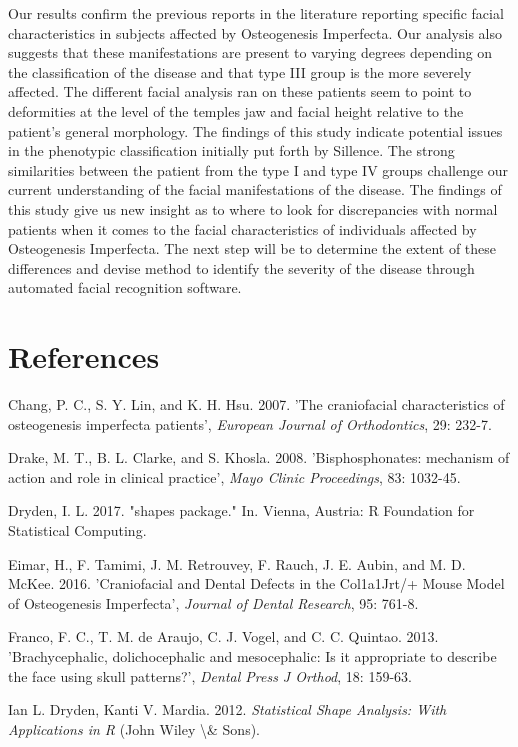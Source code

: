 \documentclass{article}
\begin{document}
\begin{multicols}{2}
Our results confirm the previous reports in the literature reporting
specific facial characteristics in subjects affected by Osteogenesis
Imperfecta. Our analysis also suggests that these manifestations are
present to varying degrees depending on the classification of the
disease and that type III group is the more severely affected. The
different facial analysis ran on these patients seem to point to
deformities at the level of the temples jaw and facial height relative
to the patient's general morphology. The findings of this study indicate
potential issues in the phenotypic classification initially put forth by
Sillence. The strong similarities between the patient from the type I
and type IV groups challenge our current understanding of the facial
manifestations of the disease. The findings of this study give us new
insight as to where to look for discrepancies with normal patients when
it comes to the facial characteristics of individuals affected by
Osteogenesis Imperfecta. The next step will be to determine the extent
of these differences and devise method to identify the severity of the
disease through automated facial recognition software.

\section{References}

Chang, P. C., S. Y. Lin, and K. H. Hsu. 2007. 'The craniofacial
characteristics of osteogenesis imperfecta patients', \emph{European
Journal of Orthodontics}, 29: 232-7.

Drake, M. T., B. L. Clarke, and S. Khosla. 2008. 'Bisphosphonates:
mechanism of action and role in clinical practice', \emph{Mayo Clinic
Proceedings}, 83: 1032-45.

Dryden, I. L. 2017. "shapes package." In. Vienna, Austria: R Foundation
for Statistical Computing.

Eimar, H., F. Tamimi, J. M. Retrouvey, F. Rauch, J. E. Aubin, and M. D.
McKee. 2016. 'Craniofacial and Dental Defects in the Col1a1Jrt/+ Mouse
Model of Osteogenesis Imperfecta', \emph{Journal of Dental Research},
95: 761-8.

Franco, F. C., T. M. de Araujo, C. J. Vogel, and C. C. Quintao. 2013.
'Brachycephalic, dolichocephalic and mesocephalic: Is it appropriate to
describe the face using skull patterns?', \emph{Dental Press J Orthod},
18: 159-63.

Ian L. Dryden, Kanti V. Mardia. 2012. \emph{Statistical Shape Analysis:
With Applications in R} (John Wiley \textbackslash{}\& Sons).


\end{multicols}
\end{document}
